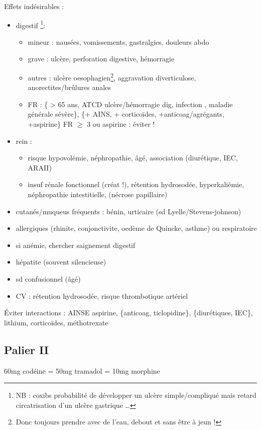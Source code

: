 \documentclass[11pt]{article}
\begin{document}
Effets indésirables :
\begin{itemize}
\item digestif \footnote{NB : coxibs \dec probabilité de développer un ulcère simple/compliqué
mais retard circatrisation d'un ulcère gastrique \ldots{}}: 
\begin{itemize}
\item mineur : nausées, vomissements, gastralgies, douleurs abdo
\item grave : ulcère, perforation digestive, hémorragie
\item autres : ulcère oesophagien\footnote{Donc toujours prendre avec de l'eau, debout et sans être à jeun !}, aggravation diverticulose,
anorectites/brûlures anales
\item FR : \{ > 65 ans, ATCD ulcère/hémorragie dig, infection ,
maladie générale sévère\}, \{+ AINS, + corticoïdes, +anticoag/agrégants,
+aspirine\}
\thus FR \(\ge\) 3 ou aspirine : éviter !
\end{itemize}
\item rein :
\begin{itemize}
\item \danger risque hypovolémie, néphropathie, âgé, association (diurétique, IEC,
ARAII)
\item insuf rénale fonctionnel (créat !), rétention hydrosodée, hyperkaliémie,
néphropathie intestitielle, (nécrose papillaire)
\end{itemize}
\item cutanés/muqueus fréquents : bénin, urticaire (sd Lyelle/Stevens-johnson)
\item allergiques (rhinite, conjonctivite, oedème de Quincke, asthme) ou respiratoire
\item si anémie, chercher saignement digestif
\item hépatite (souvent silencieuse)
\item sd confusionnel (âgé)
\item CV : rétention hydrosodée, \inc risque thrombotique artériel
\end{itemize}

Éviter interactions : AINSE aspirine, \{anticoag, ticlopidine\}, \{diurétiques,
IEC\}, lithium, corticoïdes, méthotrexate


\subsection{Palier II}
\label{sec:orgf2e7d6a}
60mg codéine = 50mg tramadol = 10mg morphine
\end{document}
